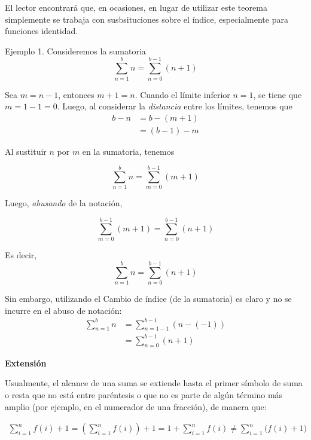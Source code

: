 El lector encontrará que, en ocasiones, en lugar de utilizar este teorema simplemente se trabaja con susbsituciones sobre el índice, especialmente para funciones identidad. 

Ejemplo 1. Consideremos la sumatoria
  \[\sum_{n=1}^{b} n = \sum_{n=0}^{b-1} (n+1)\]
  
  Sea $m=n-1$, entonces $m+1=n$. Cuando el límite inferior $n=1$, se tiene que $m=1-1=0$. Luego, al considerar la \textit{distancia} entre los límites, tenemos que
  \begin{align*}
    b - n &= b - (m+1)\\
    &= (b-1) - m
  \end{align*}
  
  Al sustituir $n$ por $m$ en la sumatoria, tenemos
  
  \[\sum_{n=1}^{b} n = \sum_{m=0}^{b-1} (m+1)\]
  
  Luego, \textit{abusando} de la notación, 
  
  \[\sum_{m=0}^{b-1} (m+1) = \sum_{n=0}^{b-1} (n+1)\]
  
  Es decir, \[\sum_{n=1}^{b} n = \sum_{n=0}^{b-1} (n+1)\]
  
  Sin embargo, utilizando el Cambio de índice (de la sumatoria) es claro y no se incurre en el abuso de notación:
  \begin{align*}
    \sum_{n=1}^{b} n &= \sum_{n=1-1}^{b-1} (n-(-1))\\
    &= \sum_{n=0}^{b-1} (n+1)
  \end{align*}
  
  

\textbf{Extensión}

Usualmente, el alcance de una suma se extiende hasta el primer símbolo de suma o resta que no está entre paréntesis o que no es parte de algún término más amplio (por ejemplo, en el numerador de una fracción), de manera que:

\begin{align*}
  \sum_{i=1}^{n} f(i) + 1 = \left(\sum_{i=1}^{n}f(i)\right) + 1 = 1 + \sum_{i=1}^{n} f(i) \neq \sum_{i=1}^{n} \bigl(f(i)+1\bigr)
\end{align*}

